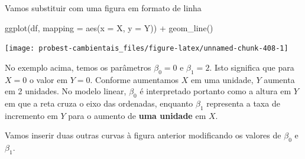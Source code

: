 \documentclass[
]{book}
\newenvironment{Shaded}{\begin{snugshade}}{\end{snugshade}}
\newcommand{\AttributeTok}[1]{\textcolor[rgb]{0.77,0.63,0.00}{#1}}
\newcommand{\FunctionTok}[1]{\textcolor[rgb]{0.00,0.00,0.00}{#1}}
\newcommand{\NormalTok}[1]{#1}
\newcommand{\SpecialCharTok}[1]{\textcolor[rgb]{0.00,0.00,0.00}{#1}}
\begin{document}
Vamos substituir com uma figura em formato de linha

\begin{Shaded}
\begin{Highlighting}[]
\FunctionTok{ggplot}\NormalTok{(df, }\AttributeTok{mapping =} \FunctionTok{aes}\NormalTok{(}\AttributeTok{x =}\NormalTok{ X, }\AttributeTok{y =}\NormalTok{ Y)) }\SpecialCharTok{+}
  \FunctionTok{geom\_line}\NormalTok{()}
\end{Highlighting}
\end{Shaded}

\begin{center}\texttt{[image: probest-cambientais\_files/figure-latex/unnamed-chunk-408-1]} \end{center}

No exemplo acima, temos os parâmetros \(\beta_0 = 0\) e \(\beta_1 = 2\). Isto significa que para \(X = 0\) o valor em \(Y = 0\). Conforme aumentamos \(X\) em uma unidade, \(Y\) aumenta em 2 unidades. No modelo linear, \(\beta_0\) é interpretado portanto como a altura em \(Y\) em que a reta cruza o eixo das ordenadas, enquanto \(\beta_1\) representa a taxa de incremento em \(Y\) para o aumento de \textbf{uma unidade} em \(X\).

Vamos inserir duas outras curvas à figura anterior modificando os valores de \(\beta_0\) e \(\beta_1\).
\end{document}
